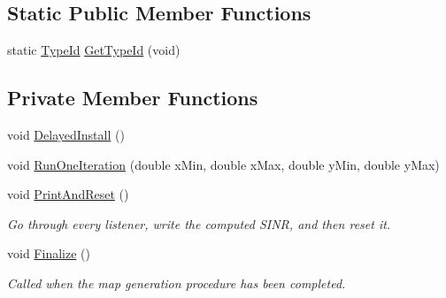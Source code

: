 \subsection*{Static Public Member Functions}
\begin{DoxyCompactItemize}
\item 
static \hyperlink{classns3_1_1TypeId}{Type\+Id} \hyperlink{classns3_1_1RadioEnvironmentMapHelper_aa2dafba1723715b96f5a7eb7b5c20439}{Get\+Type\+Id} (void)
\end{DoxyCompactItemize}
\subsection*{Private Member Functions}
\begin{DoxyCompactItemize}
\item 
void \hyperlink{classns3_1_1RadioEnvironmentMapHelper_ab8591d08fcb179f5ba004d05feded580}{Delayed\+Install} ()
\item 
void \hyperlink{classns3_1_1RadioEnvironmentMapHelper_ae6b9af1e31cdc5cf11ef5879d5925908}{Run\+One\+Iteration} (double x\+Min, double x\+Max, double y\+Min, double y\+Max)
\item 
void \hyperlink{classns3_1_1RadioEnvironmentMapHelper_ad13222cf3dd421b74faccc50f3d855bc}{Print\+And\+Reset} ()
\begin{DoxyCompactList}\small\item\em Go through every listener, write the computed S\+I\+NR, and then reset it. \end{DoxyCompactList}\item 
void \hyperlink{classns3_1_1RadioEnvironmentMapHelper_a8788344609c6baed271618f06a33f3f9}{Finalize} ()
\begin{DoxyCompactList}\small\item\em Called when the map generation procedure has been completed. \end{DoxyCompactList}\end{DoxyCompactItemize}
